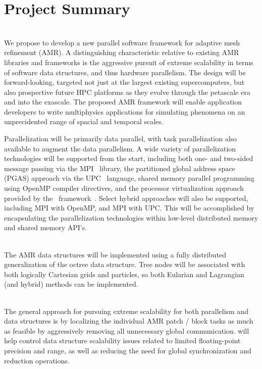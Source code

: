 \documentclass{article}
\begin{document}
\section{Project Summary}  \label{s:summary}


\ \\  
%
We propose to develop a new parallel software framework for adaptive
mesh refinement (AMR).  
%
A distinguishing characteristic relative to existing AMR libraries and
frameworks is the aggressive pursuit of extreme scalability in terms
of software data structures, and thus hardware parallelism.
%
The design will be forward-looking, targeted not just at the largest
existing supercomputers, but also prospective future HPC platforms as
they evolve through the petascale era and into the exascale.
%
The proposed AMR framework will enable application developers to
write multiphysics applications for simulating phenomena on an
unprecidented range of spacial and temporal scales.

Parallelization will be primarily data parallel, with task
parallelization also available to augment the data parallelism.  A
wide variety of parallelization technologies will be supported from
the start, including both one- and two-sided message passing via the
MPI~\cite{@@@MPI} library, the partitioned global address space (PGAS)
approach via the UPC~\cite{@@@UPC} language, shared memory parallel
programming using OpenMP compiler directives, and the processor
virtualization approach provided by the \charm\
framework~\cite{@@@Charm}.  Select hybrid approaches will also be
supported, including MPI with OpenMP, and MPI with UPC.  This will be
accomplished by encapsulating the parallelization technologies within
low-level distributed memory and shared memory API's.


\ \\ 
%
The AMR data structures will be implemented using a fully distributed
generalization of the octree data structure.  Tree nodes will be
associated with both logically Cartesian grids and particles, so both
Eularian and Lagrangian (and hybrid) methods can be implemented.

\ \\  The general approach for pursuing
extreme scalability for both parallelism and data structures is by
localizing the individual AMR patch / block tasks as much as feasible
by aggressively removing all unnecessary global communication.  
will help control data structure scalability issues related to limited
floating-point precision and range, as well as reducing the need for
global synchronization and reduction operations.
\end{document}
